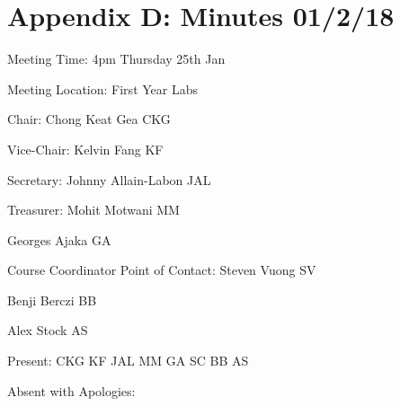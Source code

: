 
\noindent 
\section{Appendix D: Minutes 01/2/18}

\noindent Meeting Time: 4pm Thursday 25th Jan

\noindent Meeting Location: First Year Labs\textbf{}\\

\noindent 

\noindent \textbf{}

\noindent Chair: Chong Keat Gea CKG

\noindent Vice-Chair: Kelvin Fang KF

\noindent Secretary: Johnny Allain-Labon JAL

\noindent Treasurer: Mohit Motwani MM

\noindent Georges Ajaka GA

\noindent Course Coordinator Point of Contact: Steven Vuong SV

\noindent Benji Berczi BB

\noindent Alex Stock AS

\noindent 

\noindent Present: CKG KF JAL MM GA SC BB AS

\noindent Absent with Apologies: \\

\noindent 

